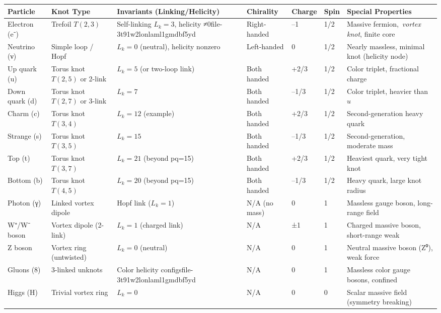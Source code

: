 \documentclass[a4paper,12pt]{article}
\begin{document}
\begin{table}
        \centering
        \begin{tabular}{lllllll}
            \toprule
            \textbf{Particle} & \textbf{Knot Type} & \textbf{Invariants (Linking/Helicity)} & \textbf{Chirality} & \textbf{Charge} & \textbf{Spin} & \textbf{Special Properties} \\
            \midrule
            Electron (e⁻) & Trefoil $T(2,3)$ & Self-linking $L_k=3$, helicity ≠0file-3t91w2lonlaml1gmdbf5yd & Right-handed & –1 & 1/2 & Massive fermion, \textit{vortex knot}, finite core \\
            Neutrino (ν) & Simple loop / Hopf & $L_k=0$ (neutral), helicity nonzero & Left-handed & 0 & 1/2 & Nearly massless, minimal knot (helicity node) \\
            Up quark (u) & Torus knot $T(2,5)$ or 2-link & $L_k=5$ (or two-loop link) & Both handed & +2/3 & 1/2 & Color triplet, fractional charge \\
            Down quark (d) & Torus knot $T(2,7)$ or 3-link & $L_k=7$ & Both handed & –1/3 & 1/2 & Color triplet, heavier than $u$ \\
            Charm (c) & Torus knot $T(3,4)$ & $L_k=12$ (example) & Both handed & +2/3 & 1/2 & Second-generation heavy quark \\
            Strange (s) & Torus knot $T(3,5)$ & $L_k=15$ & Both handed & –1/3 & 1/2 & Second-generation, moderate mass \\
            Top (t) & Torus knot $T(3,7)$ & $L_k=21$ (beyond pq=15) & Both handed & +2/3 & 1/2 & Heaviest quark, very tight knot \\
            Bottom (b) & Torus knot $T(4,5)$ & $L_k=20$ (beyond pq=15) & Both handed & –1/3 & 1/2 & Heavy quark, large knot radius \\
            Photon (γ) & Linked vortex dipole & Hopf link ($L_k=1$) & N/A (no mass) & 0 & 1 & Massless gauge boson, long-range field \\
            W⁺/W⁻ boson & Vortex dipole (2-link) & $L_k=1$ (charged link) & N/A & ±1 & 1 & Charged massive boson, short-range weak \\
            Z boson & Vortex ring (untwisted) & $L_k=0$ (neutral) & N/A & 0 & 1 & Neutral massive boson (Z⁰), weak force \\
            Gluons (8) & 3-linked unknots & Color helicity configsfile-3t91w2lonlaml1gmdbf5yd & N/A & 0 & 1 & Massless color gauge bosons, confined \\
            Higgs (H) & Trivial vortex ring & $L_k=0$ & N/A & 0 & 0 & Scalar massive field (symmetry breaking) \\

\end{tabular}
\end{table}
\end{document}
